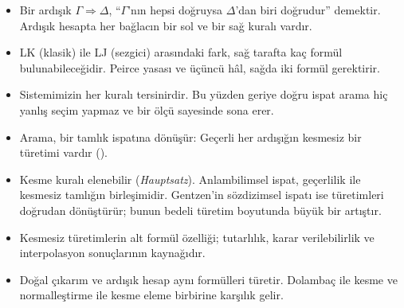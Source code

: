 \begin{bolumozeti}
\begin{itemize}
  \item Bir ardışık $\Gamma \Rightarrow \Delta$, ``$\Gamma$'nın hepsi
        doğruysa $\Delta$'dan biri doğrudur'' demektir. Ardışık hesapta
        her bağlacın bir sol ve bir sağ kuralı vardır.
  \item LK (klasik) ile LJ (sezgici) arasındaki fark, sağ tarafta kaç
        formül bulunabileceğidir. Peirce yasası ve üçüncü hâl, sağda iki
        formül gerektirir.
  \item Sistemimizin her kuralı tersinirdir. Bu yüzden geriye doğru ispat
        arama hiç yanlış seçim yapmaz ve bir ölçü sayesinde sona erer.
  \item Arama, bir tamlık ispatına dönüşür: Geçerli her ardışığın
        kesmesiz bir türetimi vardır ().
  \item Kesme kuralı elenebilir (\emph{Hauptsatz}). Anlambilimsel ispat,
        geçerlilik ile kesmesiz tamlığın birleşimidir. Gentzen'in
        sözdizimsel ispatı ise türetimleri doğrudan dönüştürür; bunun
        bedeli türetim boyutunda büyük bir artıştır.
  \item Kesmesiz türetimlerin alt formül özelliği; tutarlılık, karar
        verilebilirlik ve interpolasyon sonuçlarının kaynağıdır.
  \item Doğal çıkarım ve ardışık hesap aynı formülleri türetir. Dolambaç
        ile kesme ve normalleştirme ile kesme eleme birbirine karşılık
        gelir.
\end{itemize}
\end{bolumozeti}

